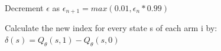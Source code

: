 \documentclass{slides}
\begin{document}
{{\begin{algorithm}[H]
\begin{small}
\begin{algorithmic}[1]
        \State Decrement $\epsilon$ as $\epsilon_{n+1}=max(0.01,\epsilon_{n}*0.99)$
                
        
    \EndFor
    \State Calculate the new index for every state s of each arm i by:
        \Statex\hspace*{5mm} $\delta(s)=Q_{\theta}(s,1)-Q_{\theta}(s,0)$
\end{algorithmic}
\end{small}
\end{algorithm}
\newpage
\begin{center}
    

\end{center}}}
\end{document}
